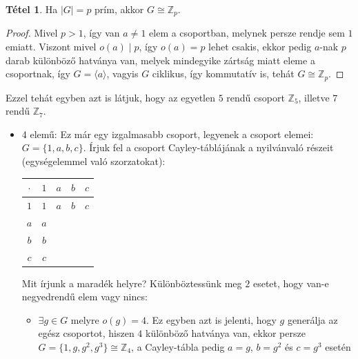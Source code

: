 \documentclass[12pt]{book}
\theoremstyle{plain} %
\theoremstyle{definition} %
\newtheorem{theo/}{Tétel}[section]
\newenvironment{theo}
  {\renewcommand{\qedsymbol}{$\clubsuit$}%
   \pushQED{\qed}\begin{theo/}}
  {\popQED\end{theo/}}
\theoremstyle{remark}
\renewcommand\qedsymbol{$\blacksquare$}
\numberwithin{equation}{section}  %
\def\Z{\mathbb{Z}}
\begin{document}
	\begin{theo}\label{primrendu}
		Ha $|G|=p$ prím, akkor $G\cong \Z_p$.
	\end{theo}

	\begin{proof}
		Mivel $p>1$, így van $a\neq 1$ elem a csoportban, melynek persze rendje sem $1$ emiatt. Viszont mivel $o(a) \mid p$, így $o(a) = p$ lehet csakis, ekkor pedig $a$-nak $p$ darab különböző hatványa van, melyek mindegyike zártság miatt eleme a csoportnak, így $G=\langle a \rangle$, vagyis $G$ ciklikus, így kommutatív is, tehát $G\cong \Z_p$.
	\end{proof}
	
	Ezzel tehát egyben azt is látjuk, hogy az egyetlen $5$ rendű csoport $\Z_5$, illetve $7$ rendű $\Z_7$.
	
	\begin{itemize}
		\item{4 elemű:
			Ez már egy izgalmasabb csoport, legyenek a csoport elemei: $G=\{1, a, b, c\}$. Írjuk fel a csoport Cayley-táblájának a nyilvánvaló részeit (egységelemmel való szorzatokat):
			\begin{center}
				\setlength{\tabcolsep}{0.7em} %
				\renewcommand{\arraystretch}{1.5}
				\begin{tabular}{ | c || c | c | c | c | }
					\hline
					$\cdot$ & $1$ & $a$ & $b$ & $c$ \\
					\hline
					\hline
					$1$ & $1$ & $a$ & $b$ & $c$ \\
					\hline
					$a$ & $a$ & & & \\
					\hline
					$b$ & $b$ & & & \\
					\hline
					$c$ & $c$ & & & \\   
					\hline 
				\end{tabular}
			\end{center}
			Mit írjunk a maradék helyre? Különböztessünk meg $2$ esetet, hogy van-e negyedrendű elem vagy nincs:
			\begin{itemize}
				\item{
					$\exists g\in G$ melyre $o(g) = 4$. Ez egyben azt is jelenti, hogy $g$ generálja az egész csoportot, hiszen $4$ különböző hatványa van, ekkor persze $G=\{1, g, g^2, g^3\} \cong \Z_4$, a Cayley-tábla pedig $a=g$, $b=g^2$ és $c=g^3$ esetén
					\begin{center}
						\setlength{\tabcolsep}{0.7em} %
						\renewcommand{\arraystretch}{1.5}
						\begin{tabular}{ | c || c | c | c | c | }

\end{tabular}
\end{center}}
\end{itemize}}
\end{itemize}
\end{document}

